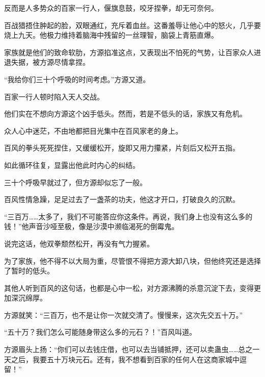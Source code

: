 \begin{this_body}
反而是人多势众的百家一行人，偃旗息鼓，咬牙捏拳，却无可奈何。

百战猎捂住肿起的脸，双眼通红，充斥着血丝。这番羞辱让他心中的怒火，几乎要烧上九天。他极力维持着脑海中残留的一丝理智，脑袋上青筋直爆。

家族就是他们的致命软肋，方源掐准这点，又表现出不怕死的气势，让百家众人进退失据，被方源尽情拿捏。

“我给你们三十个呼吸的时间考虑。”方源又道。

百家一行人顿时陷入天人交战。

他们实在不想向方源这个凶手低头。然而，若是不低头的话，家族又有危机。

众人心中迷茫，不由地都把目光集中在百风家老的身上。

百风的拳头死死捏住，又缓缓松开，旋即又用力攥紧，片刻后又松开五指。

如此循环往复，显露出他此时内心的纠结。

三十个呼吸早就过了，但方源却似忘了一般。

百风性情急躁，足足过去了一盏茶的功夫，他这才开口，打破良久的沉默。

“三百万……太多了，我们不可能答应你这条件。再说，我们身上也没有这么多的钱！”他声音沙哑至极，像是沙漠中濒临渴死的倒霉鬼。

说完这话，他双拳颓然松开，再没有气力握紧。

为了家族，他不得不以大局为重，尽管恨不得把方源大卸八块，但他终究还是选择了暂时的低头。

其他人听到百风的这句话，也都是心中一松，对方源沸腾的杀意沉淀下去，变得更加深沉绵厚。

方源就笑：“三百万，也不是让你一次就交清了。慢慢来，这次先交五十万。”

“五十万？我们怎么可能随身带这么多的元石？！”百风叫道。

方源眉头上扬：“你们可以去钱庄借，也可以去当铺抵押，还可以卖蛊虫……总之一天之后，我要五十万块元石。还有，我不想看到百家的任何人在这商家城中逗留！”

\end{this_body}

